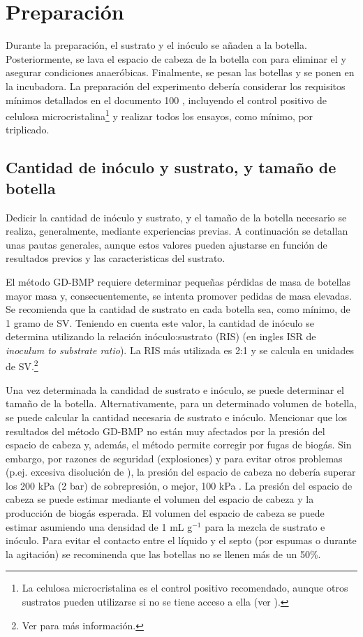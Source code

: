 \documentclass[]{article}
\begin{document}
\section{Preparación}
\label{sec:setup}
Durante la preparación, el sustrato y el inóculo se añaden a la botella. Posteriormente, se lava el espacio de cabeza de la botella con  para eliminar el  y asegurar condiciones anaeróbicas. Finalmente, se pesan las botellas y se ponen en la incubadora.
La preparación del experimento debería considerar los requisitos mínimos detallados en el documento 100 \citep{BMPdoc100req}, incluyendo el control positivo de celulosa microcristalina\footnote{La celulosa microcristalina es el control positivo recomendado, aunque otros sustratos pueden utilizarse si no se tiene acceso a ella (ver \citet{kochEvaluationCommonSupermarket2020}).} y realizar todos los ensayos, como mínimo, por triplicado.

\subsection{Cantidad de inóculo y sustrato, y tamaño de botella}
\label{sec:quantities}
Dedicir la cantidad de inóculo y sustrato, y el tamaño de la botella necesario se realiza, generalmente, mediante experiencias previas. A continuación se detallan unas pautas generales, aunque estos valores pueden ajustarse en función de resultados previos y las caracteristicas del sustrato. 

El método GD-BMP requiere determinar pequeñas pérdidas de masa de botellas mayor masa y, consecuentemente, se intenta promover pedidas de masa elevadas.
Se recomienda que la cantidad de sustrato en cada botella sea, como mínimo, de 1 gramo de  SV.
Teniendo en cuenta este valor, la cantidad de inóculo se determina utilizando la relación inóculo:sustrato (RIS) (en ingles ISR de \textit{inoculum to substrate ratio}). La RIS más utilizada es 2:1 y se calcula en unidades de SV.\footnote{Ver \citet{holligerStandardizationBiomethanePotential2016} para más información.}

Una vez determinada la candidad de sustrato e inóculo, se puede determinar el tamaño de la botella. Alternativamente, para un determinado volumen de botella, se puede calcular la cantidad necesaria de sustrato e inóculo. Mencionar que los resultados del método GD-BMP no están muy afectados por la presión del espacio de cabeza y, además, el método permite corregir por fugas de biogás.
Sin embargo, por razones de seguridad (explosiones) y para evitar otros problemas (p.ej. excesiva disolución de ), la presión del espacio de cabeza no debería superar los 200 kPa (2 bar) de sobrepresión, o mejor, 100 kPa \citep{hafnerSystematicErrorManometric2019}. 
La presión del espacio de cabeza se puede estimar mediante el volumen del espacio de cabeza y la producción de biogás esperada.
El volumen del espacio de cabeza se puede estimar asumiendo una densidad de 1 mL g$^{-1}$ para la mezcla de sustrato e inóculo. Para evitar el contacto entre el líquido y el septo (por espumas o durante la agitación) se recominenda que las botellas no se llenen más de un 50\%.
\end{document}
